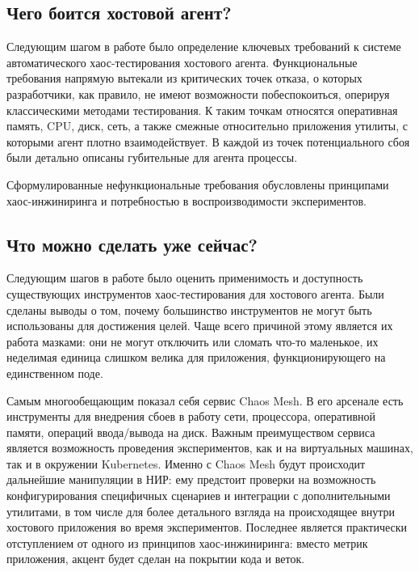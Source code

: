 \subsection{Чего боится хостовой агент?}

Следующим шагом в работе было определение ключевых требований к системе автоматического хаос-тестирования хостового агента.
Функциональные требования напрямую вытекали из критических точек отказа, о которых разработчики, как правило, не имеют возможности
побеспокоиться, оперируя классическими методами тестирования.
К таким точкам относятся оперативная память, CPU, диск, сеть, а также смежные относительно приложения утилиты,
с которыми агент плотно взаимодействует.
В каждой из точек потенциального сбоя были детально описаны губительные для агента процессы.

Сформулированные нефункциональные требования обусловлены принципами хаос-инжиниринга и потребностью в воспроизводимости
экспериментов.

\subsection{Что можно сделать уже сейчас?}

Следующим шагов в работе было оценить применимость и доступность существующих инструментов хаос-тестирования для хостового агента.
Были сделаны выводы о том, почему большинство инструментов не могут быть использованы для достижения целей.
Чаще всего причиной этому является их работа  мазками\glqq: они не могут отключить или сломать что-то маленькое,
их неделимая единица слишком велика для приложения, функционирующего на единственном поде.

Самым многообещающим показал себя сервис Chaos Mesh.
В его арсенале есть инструменты для внедрения сбоев в работу сети, процессора, оперативной памяти, операций ввода/вывода на диск.
Важным преимуществом сервиса является возможность проведения экспериментов, как и на виртуальных машинах, так и в окружении Kubernetes.
Именно с Chaos Mesh будут происходит дальнейшие манипуляции в НИР: ему предстоит проверки на возможность конфигурирования
специфичных сценариев и интеграции с дополнительными утилитами, в том числе для более детального взгляда на происходящее внутри
хостового приложения во время экспериментов.
Последнее является практически отступлением от одного из принципов хаос-инжиниринга: вместо метрик приложения,
акцент будет сделан на покрытии кода и веток.





